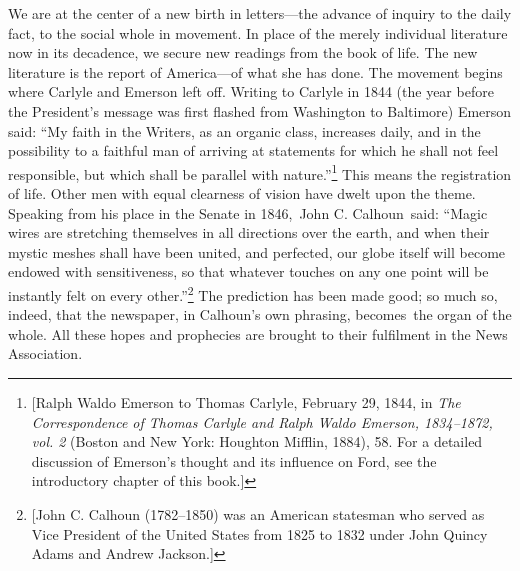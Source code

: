 \documentclass[openany,nobib]{tufte-book}
\begin{document}
We are at the center of a new birth in letters---the advance of inquiry
to the daily fact, to the social whole in movement. In place of the
merely individual literature now in its decadence, we secure new
readings from the book of life. The new literature is the report of
America---of what she has done. The movement begins where Carlyle and
Emerson left off. Writing to Carlyle in 1844 (the year before the
President's message was first flashed from Washington to Baltimore)
Emerson said: ``My faith in the Writers, as an organic class, increases
daily, and in the possibility to a faithful man of arriving at
statements for which he shall not feel responsible, but which shall be
parallel with nature.''\footnote{{[}Ralph Waldo Emerson to Thomas
  Carlyle, February 29, 1844, in \emph{The Correspondence of Thomas
  Carlyle and Ralph Waldo Emerson, 1834--1872, vol. 2} (Boston and New
  York: Houghton Mifflin, 1884), \emph{} 58. For a detailed discussion
  of Emerson's thought and its influence on Ford, see the introductory
  chapter of this book.{]}} This means the registration of life. Other
men with equal clearness of vision have dwelt upon the theme. Speaking
from his place in the Senate in 1846,~John C. Calhoun~said: ``Magic
wires are stretching themselves in all directions over the earth, and
when their mystic meshes shall have been united, and perfected, our
globe itself will become endowed with sensitiveness, so that whatever
touches on any one point will be instantly felt on every
other.''\footnote{{[}John C. Calhoun (1782--1850) was an American
  statesman who served as Vice President of the United States from 1825
  to 1832 under John Quincy Adams and Andrew Jackson.{]}} The prediction
has been made good; so much so, indeed, that the newspaper, in Calhoun's
own phrasing, becomes~the organ of the whole. All these hopes and
prophecies are brought to their fulfilment in the News Association.~

\enlargethispage{\baselineskip}
\end{document}

